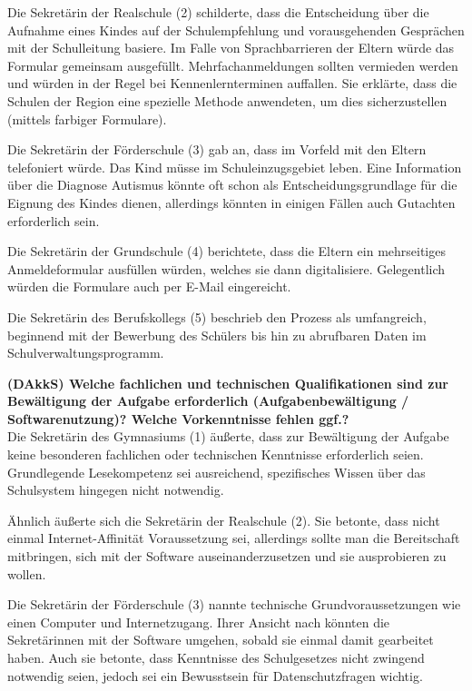 Die Sekretärin der Realschule (2) schilderte, dass die Entscheidung über die Aufnahme eines Kindes auf der Schulempfehlung und vorausgehenden Gesprächen mit der Schulleitung basiere. Im Falle von Sprachbarrieren der Eltern würde das Formular gemeinsam ausgefüllt. Mehrfachanmeldungen sollten vermieden werden und würden in der Regel bei Kennenlernterminen auffallen. Sie erklärte, dass die Schulen der Region eine spezielle Methode anwendeten, um dies sicherzustellen (mittels farbiger Formulare).

Die Sekretärin der Förderschule (3) gab an, dass im Vorfeld mit den Eltern telefoniert würde. Das Kind müsse im Schuleinzugsgebiet leben. Eine Information über die Diagnose Autismus könnte oft schon als Entscheidungsgrundlage für die Eignung des Kindes dienen, allerdings könnten in einigen Fällen auch Gutachten erforderlich sein.

Die Sekretärin der Grundschule (4) berichtete, dass die Eltern ein mehrseitiges Anmeldeformular ausfüllen würden, welches sie dann digitalisiere. Gelegentlich würden die Formulare auch per E-Mail eingereicht.

Die Sekretärin des Berufskollegs (5) beschrieb den Prozess als umfangreich, beginnend mit der Bewerbung des Schülers bis hin zu abrufbaren Daten im Schulverwaltungsprogramm.

\textbf{(DAkkS) Welche fachlichen und technischen Qualifikationen sind zur Bewältigung der Aufgabe erforderlich (Aufgabenbewältigung / Softwarenutzung)? Welche Vorkenntnisse fehlen ggf.?}\\
Die Sekretärin des Gymnasiums (1) äußerte, dass zur Bewältigung der Aufgabe keine besonderen fachlichen oder technischen Kenntnisse erforderlich seien. Grundlegende Lesekompetenz sei ausreichend, spezifisches Wissen über das Schulsystem hingegen nicht notwendig.

Ähnlich äußerte sich die Sekretärin der Realschule (2). Sie betonte, dass nicht einmal Internet-Affinität Voraussetzung sei, allerdings sollte man die Bereitschaft mitbringen, sich mit der Software auseinanderzusetzen und sie ausprobieren zu wollen.

Die Sekretärin der Förderschule (3) nannte technische Grundvoraussetzungen wie einen Computer und Internetzugang. Ihrer Ansicht nach könnten die Sekretärinnen mit der Software umgehen, sobald sie einmal damit gearbeitet haben. Auch sie betonte, dass Kenntnisse des Schulgesetzes nicht zwingend notwendig seien, jedoch sei ein Bewusstsein für Datenschutzfragen wichtig.

